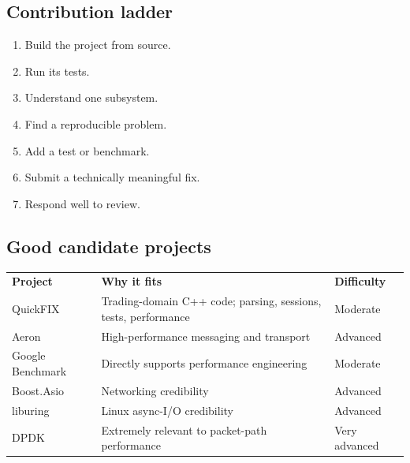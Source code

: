 \documentclass[11pt,letterpaper]{article}
\begin{document}
\subsection*{Contribution ladder}

\begin{enumerate}

\item Build the project from source.

\item Run its tests.

\item Understand one subsystem.

\item Find a reproducible problem.

\item Add a test or benchmark.

\item Submit a technically meaningful fix.

\item Respond well to review.

\end{enumerate}

\subsection*{Good candidate projects}

\begin{center}
\small
\begin{tabular}{>{\raggedright\arraybackslash}p{}>{\raggedright\arraybackslash}p{}>{\raggedright\arraybackslash}p{}}
\textbf{Project} & \textbf{Why it fits} & \textbf{Difficulty} \\
QuickFIX & Trading-domain C++ code; parsing, sessions, tests, performance & Moderate \\
Aeron & High-performance messaging and transport & Advanced \\
Google Benchmark & Directly supports performance engineering & Moderate \\
Boost.Asio & Networking credibility & Advanced \\
liburing & Linux async-I/O credibility & Advanced \\
DPDK & Extremely relevant to packet-path performance & Very advanced \\
\end{tabular}
\end{center}
\end{document}
